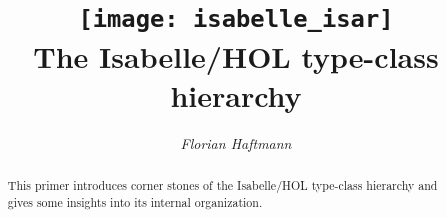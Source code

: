 \documentclass[12pt,a4paper,fleqn]{article}
\title{\texttt{[image: isabelle\_isar]}
  \\[4ex] The {Isabelle/HOL} type-class hierarchy}
\author{\emph{Florian Haftmann}}
\begin{document}
\maketitle

\begin{abstract}
  \noindent This primer introduces corner stones of the {Isabelle/HOL}
  type-class hierarchy and gives some insights into its internal
  organization.
\end{abstract}

\thispagestyle{empty}\clearpage

\clearfirst



\begingroup
 \small\raggedright\frenchspacing

\endgroup
\end{document}
